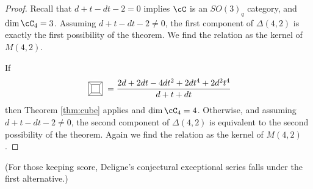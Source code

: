 \documentclass{amsart}
\newcommand{\Cube}{\prism[45]{4}}
\newcommand{\prism}[2][0]{
\begin{tikzpicture}[scale=0.8,baseline=-0.1cm]
\fill[white] (0,0) circle (0.5cm);
\foreach \x in {1, ..., #2} {
	\draw (360*\x/#2-360/#2+#1:.3cm) -- (360*\x/#2+#1:.3cm)--(360*\x/#2+#1:.5cm) -- (360*\x/#2+360/#2+#1:.5cm);
}
\end{tikzpicture}
}
\begin{document}
\begin{proof}
Recall that $d+t-dt-2 = 0$  implies $\cC$ is an $SO(3)_q$ category, and $\dim \cC_4 = 3$. Assuming $d+t-dt-2 \neq 0$, the first component of $\Delta(4,2)$ is exactly the first possibility of the theorem. We find the relation as the kernel of $M(4,2)$. 

If 
\begin{equation*}
\Cube = \frac{2d+2dt-4dt^2+2dt^4+2d^2t^4 }{d+t+dt}
\end{equation*}
then Theorem \ref{thm:cube} applies and $\dim \cC_4 = 4$. Otherwise, and assuming $d+t-dt-2 \neq 0$, the second component of $\Delta(4,2)$ is equivalent to the second possibility of the theorem. Again we find the relation as the kernel of $M(4,2)$. 

\end{proof}

(For those keeping score, Deligne's conjectural exceptional series falls under the first alternative.)
\end{document}
